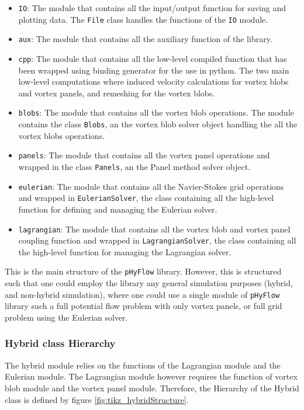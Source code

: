 \begin{itemize}
\item \texttt{IO}: The module that contains all the input/output function for saving and plotting data. The \texttt{File} class handles the functions of the \texttt{IO} module.
\item \texttt{aux}: The module that contains all the auxiliary function of the library.
\item \texttt{cpp}: The module that contains all the low-level compiled function that has been wrapped using binding generator for the use in python. The two main low-level computations where induced velocity calculations for vortex blobs and vortex panels, and remeshing for the vortex blobs.
\item \texttt{blobs}: The module that contains all the vortex blob operations. The module contains the class \texttt{Blobs}, an the vortex blob solver object handling the all the vortex blobs operations.
\item \texttt{panels}: The module that contains all the vortex panel operations and wrapped in the class \texttt{Panels}, an the Panel method solver object.
\item \texttt{eulerian}: The module that contains all the Navier-Stokes grid operations and wrapped in \texttt{EulerianSolver}, the class containing all the high-level function for defining and managing the Eulerian solver.
\item \texttt{lagrangian}: The module that contains all the vortex blob and vortex panel coupling function and wrapped in \texttt{LagrangianSolver}, the class containing all the high-level function for managing the Lagrangian solver.
\end{itemize}


This is the main structure of the \texttt{pHyFlow} library. However, this is structured such that one could employ the library any general simulation purposes (hybrid, and non-hybrid simulation), where one could use a single module of \texttt{pHyFlow} library such a full potential flow problem with only vortex panels, or full grid problem using the Eulerian solver. 

\subsubsection{Hybrid class Hierarchy}

The hybrid module relies on the functions of the Lagrangian module and the Eulerian module. The Lagrangian module however requires the function of vortex blob module and the vortex panel module. Therefore, the Hierarchy of the Hybrid class is defined by figure \ref{fig:tikz_hybridStructure}. 

